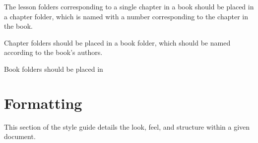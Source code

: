 \documentclass{article}
\begin{document}
The lesson folders corresponding to a single chapter in a book should be placed in a chapter folder, which is named with a number corresponding to the chapter in the book.

Chapter folders should be placed in a book folder, which should be named according to the book's authors.

Book folders should be placed in 

\section{Formatting}
This section of the style guide details the look, feel, and structure within a given document.
\end{document}
